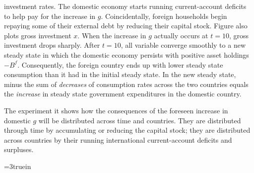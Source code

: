 investment rates. The domestic economy starts
running current-account deficits  to help pay for  the increase in $g$. Coincidentally,  foreign households begin repaying some of  their external debt by
reducing their  capital stock. Figure  also plots gross investment  $x$.  When the increase in $g$ actually occurs at $t=10$,  gross investment drops sharply. After
$t=10$, all variable converge smoothly to a new steady state in which  the
domestic economy persists with positive asset holdings $- B^f$. Consequently,  the foreign country ends up  with lower steady state consumption
than it had  in  the initial steady state.  In the new steady state, minus the sum of  {\it decreases\/} of
consumption rates across the two countries equals the {\it increase} in steady state government expenditures
in the domestic country.

The experiment  it shows how the
consequences of the foreseen increase in domestic $g$ will be distributed across time and countries. They are distributed  through time by accumulating or reducing the
capital stock; they are distributed across  countries by their running international current-account deficits and
surpluses.
\centerline{\epsfxsize=3truein}
\caption{Response to  once-and-for-all increase in $\tau_k$ at $t=10$ foreseen at time $t=1$.
From left to right, top to bottom: $k, c, \bar R, \eta, \tau_k$ and $\tau_k^*$,
and $B^f$.  Domestic country (solid line), foreign country (dotted line) and
steady-state values (dotted-dashed line).}
\endfigure



